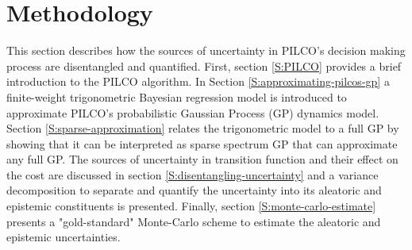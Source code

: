 
\chapter{Methodology}

\ifpdf
    \graphicspath{{Chapter2/Figs/Raster/}{Chapter2/Figs/PDF/}{Chapter2/Figs/}{Chapter2/Figures/}}
\else
    \graphicspath{{Chapter2/Figs/Vector/}{Chapter2/Figs/}{Chapter2/Figures/}}
\fi

This section describes how the sources of uncertainty in PILCO's decision making process are disentangled and quantified. First, section \ref{S:PILCO} provides a brief introduction to the PILCO algorithm. In Section \ref{S:approximating-pilcos-gp} a finite-weight trigonometric Bayesian regression model is introduced to approximate PILCO's probabilistic Gaussian Process (GP) dynamics model. Section \ref{S:sparse-approximation} relates the trigonometric model to a full GP by showing that it can be interpreted as sparse spectrum GP that can approximate any full GP. The sources of uncertainty in transition function and their effect on the cost are discussed in section \ref{S:disentangling-uncertainty} and a variance decomposition to separate and quantify the uncertainty into its aleatoric and epistemic constituents is presented. Finally, section \ref{S:monte-carlo-estimate} presents a "gold-standard" Monte-Carlo scheme to estimate the aleatoric and epistemic uncertainties. 

